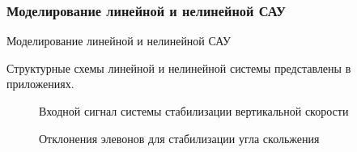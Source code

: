 \begin{center}
    \subsubsection{Моделирование линейной и нелинейной САУ}Моделирование линейной и нелинейной САУ
\end{center}

Структурные схемы линейной и нелинейной системы представлены в приложениях.

\begin{figure}[H]
    \caption{Входной сигнал системы стабилизации вертикальной скорости }
    \label{fig:Входной сигнал системы стабилизации вертикальной скорости}
\end{figure}

\begin{figure}[H]
    \caption{Отклонения элевонов для стабилизации угла скольжения}
    \label{fig:Отклонения элевонов для стабилизации угла скольжения}
\end{figure}

